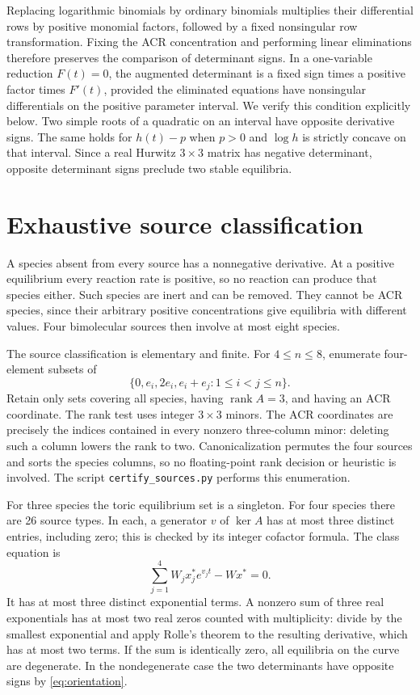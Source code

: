 \documentclass[11pt,a4paper]{report}
\providecommand{\rank}{\operatorname{rank}}
\begin{document}
Replacing logarithmic binomials by ordinary binomials multiplies their differential rows by positive
monomial factors, followed by a fixed nonsingular row transformation. Fixing the ACR concentration and
performing linear eliminations therefore preserves the comparison of determinant signs.
In a one-variable reduction $F(t)=0$, the augmented determinant is a fixed sign times a positive
factor times $F'(t)$, provided the eliminated equations have nonsingular differentials on the positive
parameter interval. We verify this condition explicitly below. Two simple roots of a quadratic on an
interval have opposite derivative signs. The same holds for $h(t)-p$ when $p>0$ and $\log h$ is
strictly concave on that interval. Since a real Hurwitz $3\times3$ matrix has negative determinant,
opposite determinant signs preclude two stable equilibria.

\section{Exhaustive source classification}
A species absent from every source has a nonnegative derivative. At a positive equilibrium every
reaction rate is positive, so no reaction can produce that species either. Such species are inert and
can be removed. They cannot be ACR species, since their arbitrary positive concentrations give
equilibria with different values. Four bimolecular sources then involve at most eight species.

The source classification is elementary and finite. For $4\le n\le8$, enumerate four-element subsets
of
\[
 \{0,e_i,2e_i,e_i+e_j:1\le i<j\le n\}.
\]
Retain only sets covering all species, having $\rank A=3$, and having an ACR coordinate.
The rank test uses integer $3\times3$ minors. The ACR coordinates are precisely the indices contained
in every nonzero three-column minor: deleting such a column lowers the rank to two.
Canonicalization permutes the four sources and sorts the species columns, so no floating-point
rank decision or heuristic is involved. The script \texttt{certify\_sources.py} performs this enumeration.

For three species the toric equilibrium set is a singleton. For four species there are 26 source types.
In each, a generator $v$ of $\ker A$ has at most three distinct entries, including zero; this is checked
by its integer cofactor formula. The class equation is
\[
 \sum_{j=1}^4 W_j x_j^* e^{v_j t}-Wx^*=0.
\]
It has at most three distinct exponential terms. A nonzero sum of three real exponentials has at most
two real zeros counted with multiplicity: divide by the smallest exponential and apply Rolle's theorem
to the resulting derivative, which has at most two terms. If the sum is identically zero, all equilibria
on the curve are degenerate. In the nondegenerate case the two determinants have opposite signs by
\eqref{eq:orientation}.
\end{document}
